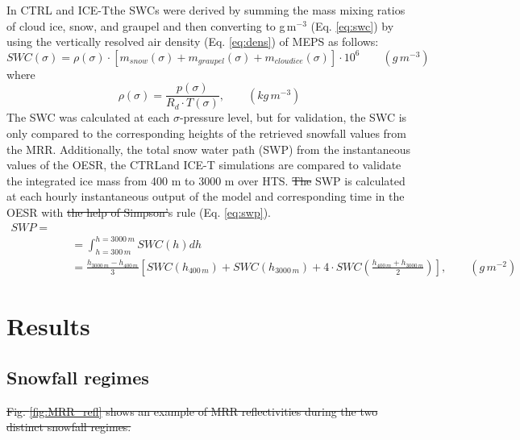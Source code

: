 \documentclass{ametsocV5}
\providecommand{\DIFadd}[1]{{\protect\color{blue}\uwave{#1}}} %
\providecommand{\DIFdel}[1]{{\protect\color{red}\sout{#1}}}                      %
\providecommand{\DIFaddbegin}{} %
\providecommand{\DIFaddend}{} %
\providecommand{\DIFdelbegin}{} %
\providecommand{\DIFdelend}{} %
\newcommand{\DIFscaledelfig}{0.5}
\newlength{\DIFdelgraphicswidth} %
\newlength{\DIFdelgraphicsheight} %
\newcommand{\DIFaddincludegraphics}[2][]{{\color{blue}\fbox{\DIFOincludegraphics[#1]{#2}}}} %
\newcommand{\DIFdelincludegraphics}[2][]{%
\sbox{\DIFdelgraphicsbox}{\DIFOincludegraphics[#1]{#2}}%
\settoboxwidth{\DIFdelgraphicswidth}{\DIFdelgraphicsbox} %
\settoboxtotalheight{\DIFdelgraphicsheight}{\DIFdelgraphicsbox} %
\scalebox{\DIFscaledelfig}{%
\parbox[b]{\DIFdelgraphicswidth}{\usebox{\DIFdelgraphicsbox}\\[-\baselineskip] \rule{\DIFdelgraphicswidth}{0em}}\llap{\resizebox{\DIFdelgraphicswidth}{\DIFdelgraphicsheight}{%
\setlength{\unitlength}{\DIFdelgraphicswidth}%
\begin{picture}(1,1)%
\thicklines\linethickness{2pt} %
{\color[rgb]{1,0,0}\put(0,0){\framebox(1,1){}}}%
{\color[rgb]{1,0,0}\put(0,0){\line( 1,1){1}}}%
{\color[rgb]{1,0,0}\put(0,1){\line(1,-1){1}}}%
\end{picture}%
}\hspace*{3pt}}} %
} %
\DeclareRobustCommand{\DIFaddbegin}{\DIFOaddbegin \let\includegraphics\DIFaddincludegraphics} %
\DeclareRobustCommand{\DIFaddend}{\DIFOaddend \let\includegraphics\DIFOincludegraphics} %
\DeclareRobustCommand{\DIFdelbegin}{\DIFOdelbegin \let\includegraphics\DIFdelincludegraphics} %
\DeclareRobustCommand{\DIFdelend}{\DIFOaddend \let\includegraphics\DIFOincludegraphics} %
\begin{document}
		In CTRL and ICE-T\DIFaddbegin \DIFadd{, }\DIFaddend the SWCs were derived by summing the mass mixing ratios of cloud ice, snow, and graupel and then converting to g\,m$^{-3}$ (Eq. \ref{eq:swc}) by using the vertically resolved air density (Eq. \ref{eq:dens}) of MEPS as follows:
		\begin{equation}
			SWC(\sigma) = \rho(\sigma) \cdot [m_{snow}(\sigma) + m_{graupel}(\sigma) + m_{cloud ice}(\sigma)] \cdot 10^6 \qquad (g\,m^{-3})
			\label{eq:swc}
		\end{equation}
		where
		\begin{equation}
			\rho(\sigma) = \frac{p(\sigma)}{R_d \cdot T(\sigma)}, \qquad (kg\,m^{-3})
			\label{eq:dens}
		\end{equation}
		The SWC was calculated at each $\sigma$-pressure level, but for validation, the SWC is only compared to the corresponding heights of the retrieved snowfall values from the MRR. Additionally, \DIFaddbegin \DIFadd{we compare }\DIFaddend the total snow water path (SWP) from the instantaneous values of the OESR, the CTRL\DIFaddbegin \DIFadd{, }\DIFaddend and ICE-T simulations are compared to validate the integrated ice mass from 400 m to 3000 m over HTS. \DIFdelbegin \DIFdel{The }\DIFdelend \DIFaddbegin \DIFadd{Then the }\DIFaddend SWP is calculated at each hourly instantaneous output of the model and corresponding time in the OESR with \DIFdelbegin \DIFdel{the help of Simpson’}\DIFdelend \DIFaddbegin \DIFadd{Simpson'}\DIFaddend s rule (Eq. \ref{eq:swp}).
		\begin{equation}
		\begin{split}
		SWP =\\
		&\quad = \int_{h = 300\,m}^{h = 3000\,m} SWC(h) dh  \\
		&\quad = \frac{h_{3000\,m} - h_{400\,m}}{3} \left[ SWC(h_{400\,m}) + SWC(h_{3000\,m}) + 4 \cdot SWC \left( \frac{h_{400\,m} + h_{3000\,m}}{2}\right) \right], \qquad (g\,m^{-2})
		\end{split}
		\label{eq:swp}
		\end{equation}



\section{Results}\label{sec:res}
	\subsection{Snowfall regimes}\label{sec:res:snowfall_regimes}
		\DIFdelbegin \DIFdel{Fig. \ref{fig:MRR_refl} shows an example of MRR reflectivities during the two distinct snowfall regimes. 
}%
\end{document}
